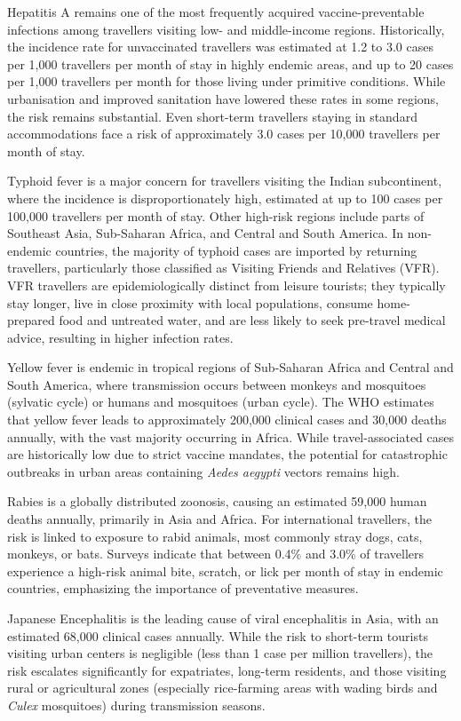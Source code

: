 Hepatitis A remains one of the most frequently acquired vaccine-preventable infections among travellers visiting low- and middle-income regions. Historically, the incidence rate for unvaccinated travellers was estimated at 1.2 to 3.0 cases per 1,000 travellers per month of stay in highly endemic areas, and up to 20 cases per 1,000 travellers per month for those living under primitive conditions. While urbanisation and improved sanitation have lowered these rates in some regions, the risk remains substantial. Even short-term travellers staying in standard accommodations face a risk of approximately 3.0 cases per 10,000 travellers per month of stay.

Typhoid fever is a major concern for travellers visiting the Indian subcontinent, where the incidence is disproportionately high, estimated at up to 100 cases per 100,000 travellers per month of stay. Other high-risk regions include parts of Southeast Asia, Sub-Saharan Africa, and Central and South America. In non-endemic countries, the majority of typhoid cases are imported by returning travellers, particularly those classified as Visiting Friends and Relatives (VFR). VFR travellers are epidemiologically distinct from leisure tourists; they typically stay longer, live in close proximity with local populations, consume home-prepared food and untreated water, and are less likely to seek pre-travel medical advice, resulting in higher infection rates.

Yellow fever is endemic in tropical regions of Sub-Saharan Africa and Central and South America, where transmission occurs between monkeys and mosquitoes (sylvatic cycle) or humans and mosquitoes (urban cycle). The WHO estimates that yellow fever leads to approximately 200,000 clinical cases and 30,000 deaths annually, with the vast majority occurring in Africa. While travel-associated cases are historically low due to strict vaccine mandates, the potential for catastrophic outbreaks in urban areas containing \textit{Aedes aegypti} vectors remains high.

Rabies is a globally distributed zoonosis, causing an estimated 59,000 human deaths annually, primarily in Asia and Africa. For international travellers, the risk is linked to exposure to rabid animals, most commonly stray dogs, cats, monkeys, or bats. Surveys indicate that between 0.4\% and 3.0\% of travellers experience a high-risk animal bite, scratch, or lick per month of stay in endemic countries, emphasizing the importance of preventative measures.

Japanese Encephalitis is the leading cause of viral encephalitis in Asia, with an estimated 68,000 clinical cases annually. While the risk to short-term tourists visiting urban centers is negligible (less than 1 case per million travellers), the risk escalates significantly for expatriates, long-term residents, and those visiting rural or agricultural zones (especially rice-farming areas with wading birds and \textit{Culex} mosquitoes) during transmission seasons.


